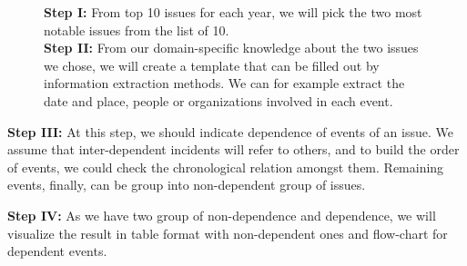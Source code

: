 \documentclass{article}
\begin{document}
\begin{figure}[H]
\begin{minipage}[c]{\textwidth-4cm}
\textbf{Step I:} From top 10 issues for each year, we will pick the two most notable issues from the list of 10.\\

\textbf{Step II:} From our domain-specific knowledge about the two issues we chose, we will create a template that can be filled out by information extraction methods. We can for example extract the date and place, people or organizations involved in each event.

\end{minipage}

\end{figure}

\large

\begin{flushleft}

\vspace*{-1cm}

\textbf{Step III:} At this step, we should indicate dependence of events of an issue. We assume that inter-dependent incidents will refer to others, and to build the order of events, we could check the chronological relation amongst them. Remaining events, finally, can be group into non-dependent group of issues.\\

\centerline{}

\textbf{Step IV:} As we have two group of non-dependence and dependence, we will visualize the result in table format with non-dependent ones and flow-chart for dependent events.

\end{flushleft}
\end{document}
